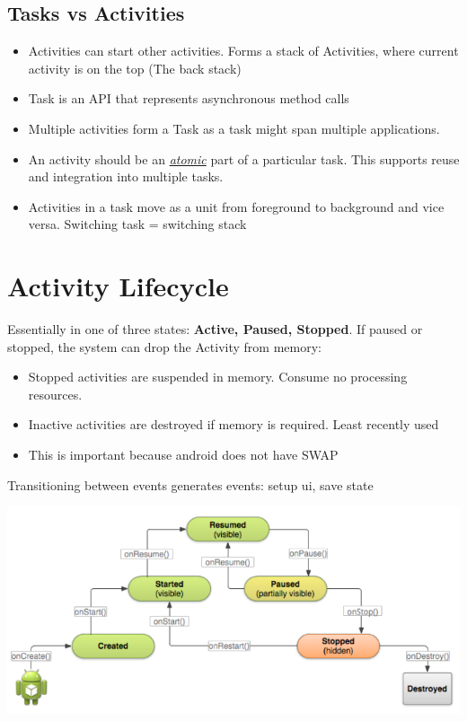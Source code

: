 \documentclass{article}
\newcommand{\worddef}[1]{\hyperref[sec:reference]{\textit{#1}}}
\begin{document}
\subsection{Tasks vs Activities}

\begin{itemize}
  \item Activities can start other activities. Forms a stack of Activities, where current activity is on the top (The back stack)
  \item Task is an API that represents asynchronous method calls  
  \item Multiple activities form a Task as a task might span multiple applications.
  \item An activity should be an \worddef{atomic} part of a particular task. This supports reuse and integration into multiple tasks.
  \item Activities in a task move as a unit from foreground to background and vice versa. Switching	task = switching stack
\end{itemize}

\section{Activity	Lifecycle}
Essentially in one of three states: \textbf{Active, Paused, Stopped}. If paused or stopped, the system can drop the Activity from memory:
\begin{itemize}
  \item Stopped activities are suspended in memory. Consume no processing resources.
  \item Inactive activities are destroyed if memory is required. Least recently used
  \item This is important because android does not have SWAP
\end{itemize}
Transitioning	between	events	generates	events: setup ui, save state

\begin{center}
  \includegraphics[scale=0.5]{activity_lifecycle.png}
\end{center}
\end{document}

